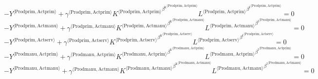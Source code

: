 \begin{equation}
-{Y}^{\langle \mathrm{Prodprim},\mathrm{Actprim}\rangle} + {{\gamma}^{\langle \mathrm{\mathrm{Prodprim}},\mathrm{\mathrm{Actprim}}\rangle}} {{{K}^{\langle \mathrm{Prodprim},\mathrm{Actprim}\rangle}}^{{\beta^{\mathrm{k}}}^{\langle \mathrm{\mathrm{Prodprim}},\mathrm{\mathrm{Actprim}}\rangle}}} {{{L}^{\langle \mathrm{Prodprim},\mathrm{Actprim}\rangle}}^{{\beta^{\mathrm{l}}}^{\langle \mathrm{\mathrm{Prodprim}},\mathrm{\mathrm{Actprim}}\rangle}}} = 0
\end{equation}
\begin{equation}
-{Y}^{\langle \mathrm{Prodprim},\mathrm{Actmanu}\rangle} + {{\gamma}^{\langle \mathrm{\mathrm{Prodprim}},\mathrm{\mathrm{Actmanu}}\rangle}} {{{K}^{\langle \mathrm{Prodprim},\mathrm{Actmanu}\rangle}}^{{\beta^{\mathrm{k}}}^{\langle \mathrm{\mathrm{Prodprim}},\mathrm{\mathrm{Actmanu}}\rangle}}} {{{L}^{\langle \mathrm{Prodprim},\mathrm{Actmanu}\rangle}}^{{\beta^{\mathrm{l}}}^{\langle \mathrm{\mathrm{Prodprim}},\mathrm{\mathrm{Actmanu}}\rangle}}} = 0
\end{equation}
\begin{equation}
-{Y}^{\langle \mathrm{Prodprim},\mathrm{Actserv}\rangle} + {{\gamma}^{\langle \mathrm{\mathrm{Prodprim}},\mathrm{\mathrm{Actserv}}\rangle}} {{{K}^{\langle \mathrm{Prodprim},\mathrm{Actserv}\rangle}}^{{\beta^{\mathrm{k}}}^{\langle \mathrm{\mathrm{Prodprim}},\mathrm{\mathrm{Actserv}}\rangle}}} {{{L}^{\langle \mathrm{Prodprim},\mathrm{Actserv}\rangle}}^{{\beta^{\mathrm{l}}}^{\langle \mathrm{\mathrm{Prodprim}},\mathrm{\mathrm{Actserv}}\rangle}}} = 0
\end{equation}
\begin{equation}
-{Y}^{\langle \mathrm{Prodmanu},\mathrm{Actprim}\rangle} + {{\gamma}^{\langle \mathrm{\mathrm{Prodmanu}},\mathrm{\mathrm{Actprim}}\rangle}} {{{K}^{\langle \mathrm{Prodmanu},\mathrm{Actprim}\rangle}}^{{\beta^{\mathrm{k}}}^{\langle \mathrm{\mathrm{Prodmanu}},\mathrm{\mathrm{Actprim}}\rangle}}} {{{L}^{\langle \mathrm{Prodmanu},\mathrm{Actprim}\rangle}}^{{\beta^{\mathrm{l}}}^{\langle \mathrm{\mathrm{Prodmanu}},\mathrm{\mathrm{Actprim}}\rangle}}} = 0
\end{equation}
\begin{equation}
-{Y}^{\langle \mathrm{Prodmanu},\mathrm{Actmanu}\rangle} + {{\gamma}^{\langle \mathrm{\mathrm{Prodmanu}},\mathrm{\mathrm{Actmanu}}\rangle}} {{{K}^{\langle \mathrm{Prodmanu},\mathrm{Actmanu}\rangle}}^{{\beta^{\mathrm{k}}}^{\langle \mathrm{\mathrm{Prodmanu}},\mathrm{\mathrm{Actmanu}}\rangle}}} {{{L}^{\langle \mathrm{Prodmanu},\mathrm{Actmanu}\rangle}}^{{\beta^{\mathrm{l}}}^{\langle \mathrm{\mathrm{Prodmanu}},\mathrm{\mathrm{Actmanu}}\rangle}}} = 0
\end{equation}

